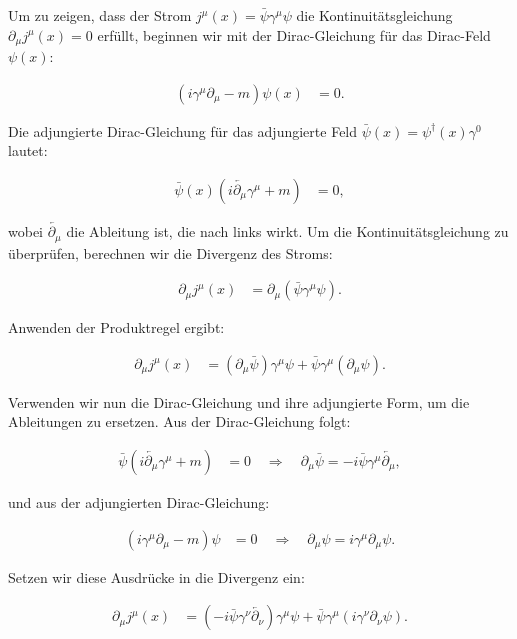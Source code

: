 Um zu zeigen, dass der Strom $j^\mu(x) = \bar{\psi} \gamma^\mu \psi$ die Kontinuitätsgleichung $\partial_\mu j^\mu(x) = 0$ erfüllt, beginnen wir mit der Dirac-Gleichung für das Dirac-Feld $\psi(x)$:

\begin{align*}
(i \gamma^\mu \partial_\mu - m) \psi(x) &= 0.
\end{align*}

Die adjungierte Dirac-Gleichung für das adjungierte Feld $\bar{\psi}(x) = \psi^\dagger(x) \gamma^0$ lautet:

\begin{align*}
\bar{\psi}(x) (i \overleftarrow{\partial_\mu} \gamma^\mu + m) &= 0,
\end{align*}

wobei $\overleftarrow{\partial_\mu}$ die Ableitung ist, die nach links wirkt. Um die Kontinuitätsgleichung zu überprüfen, berechnen wir die Divergenz des Stroms:

\begin{align*}
\partial_\mu j^\mu(x) &= \partial_\mu (\bar{\psi} \gamma^\mu \psi).
\end{align*}

Anwenden der Produktregel ergibt:

\begin{align*}
\partial_\mu j^\mu(x) &= (\partial_\mu \bar{\psi}) \gamma^\mu \psi + \bar{\psi} \gamma^\mu (\partial_\mu \psi).
\end{align*}

Verwenden wir nun die Dirac-Gleichung und ihre adjungierte Form, um die Ableitungen zu ersetzen. Aus der Dirac-Gleichung folgt:

\begin{align*}
\bar{\psi} (i \overleftarrow{\partial_\mu} \gamma^\mu + m) &= 0 \quad \Rightarrow \quad \partial_\mu \bar{\psi} = -i \bar{\psi} \gamma^\mu \overleftarrow{\partial_\mu},
\end{align*}

und aus der adjungierten Dirac-Gleichung:

\begin{align*}
(i \gamma^\mu \partial_\mu - m) \psi &= 0 \quad \Rightarrow \quad \partial_\mu \psi = i \gamma^\mu \partial_\mu \psi.
\end{align*}

Setzen wir diese Ausdrücke in die Divergenz ein:

\begin{align*}
\partial_\mu j^\mu(x) &= (-i \bar{\psi} \gamma^\nu \overleftarrow{\partial_\nu}) \gamma^\mu \psi + \bar{\psi} \gamma^\mu (i \gamma^\nu \partial_\nu \psi).
\end{align*}

